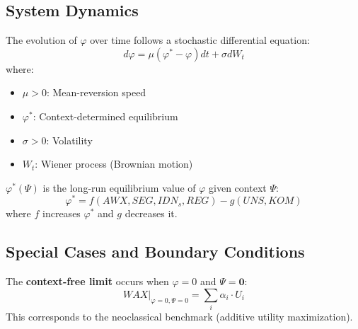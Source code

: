 
\subsection{System Dynamics}

\begin{definition}
\label{def:phi-dynamics}
The evolution of $\varphi$ over time follows a stochastic differential equation:
\begin{equation}
d\varphi = \mu(\varphi^* - \varphi)dt + \sigma dW_t
\end{equation}
where:
\begin{itemize}
\item $\mu > 0$: Mean-reversion speed
\item $\varphi^*$: Context-determined equilibrium
\item $\sigma > 0$: Volatility
\item $W_t$: Wiener process (Brownian motion)
\end{itemize}
\end{definition}

\begin{definition}
\label{def:phi-star}
$\varphi^*(\Psi)$ is the long-run equilibrium value of $\varphi$ given context $\Psi$:
\begin{equation}
\varphi^* = f(AWX, SEG, IDN_s, REG) - g(UNS, KOM)
\end{equation}
where $f$ increases $\varphi^*$ and $g$ decreases it.
\end{definition}


\subsection{Special Cases and Boundary Conditions}

\begin{definition}
\label{def:context-free}
The \textbf{context-free limit} occurs when $\varphi = 0$ and $\Psi = \mathbf{0}$:
\begin{equation}
WAX|_{\varphi=0, \Psi=0} = \sum_i \alpha_i \cdot U_i
\end{equation}
This corresponds to the neoclassical benchmark (additive utility maximization).
\end{definition}

